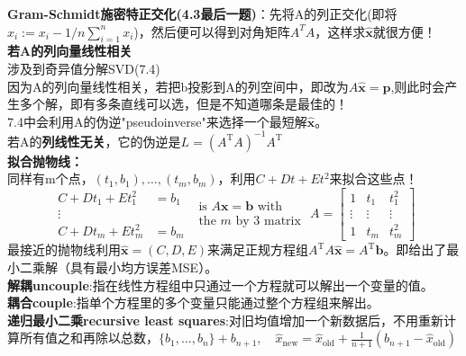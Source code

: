 \documentclass[UTF8]{article}
\begin{document}
    \textbf{Gram-Schmidt施密特正交化(4.3最后一题)}：先将A的列正交化(即将$x_i := x_i - 1/n\sum_{i=1}^{n}x_i$)，然后便可以得到对角矩阵$A^T A$，这样求$\widehat{\bm{x}}$就很方便！
    \\
    \textbf{若A的列向量线性相关}\\
    涉及到奇异值分解SVD(7.4)\\
    因为A的列向量线性相关，若把b投影到A的列空间中，即改为$A \widehat{\boldsymbol{x}}=\boldsymbol{p}$,则此时会产生多个解，即有多条直线可以选，但是不知道哪条是最佳的！
    \\
    7.4中会利用A的伪逆"pseudoinverse"来选择一个最短解$\widehat{\bm{x}}$。\\
    若A的\textbf{列线性无关}，它的伪逆是$L=\left(A^{\mathrm{T}} A\right)^{-1} A^{\mathrm{T}}$
    \\
    \textbf{拟合抛物线：}\\
    同样有m个点，$(t_{1},b_{1}), \dots, (t_{m},b_{m})$，利用$C+D t+E t^{2}$来拟合这些点！\\
    $$
    \begin{aligned} C+D t_{1}+E t_{1}^{2} &=b_{1} \\ \vdots & \\ C+D t_{m}+E t_{m}^{2} &=b_{m} \end{aligned}
    \begin{array}{l}{\text { is } A \boldsymbol{x}=\boldsymbol{b} \text { with }} \\ {\text { the } m \text { by } 3 \text { matrix }}\end{array}
    A=\left[\begin{array}{ccc}{1} & {t_{1}} & {t_{1}^{2}} \\ {\vdots} & {\vdots} & {\vdots} \\ {1} & {t_{m}} & {t_{m}^{2}}\end{array}\right]
    $$
    最接近的抛物线利用$\widehat{\boldsymbol{x}}=(C, D, E)$来满足正规方程组$A^{\mathrm{T}} A \widehat{\boldsymbol{x}}=A^{\mathrm{T}} \boldsymbol{b}$。即给出了最小二乘解（具有最小均方误差MSE）。
    \\
    \textbf{解耦uncouple}:指在线性方程组中只通过一个方程就可以解出一个变量的值。\\
    \textbf{耦合couple}:指单个方程里的多个变量只能通过整个方程组来解出。
    \\
    \textbf{递归最小二乘recursive least squares}:对旧均值增加一个新数据后，不用重新计算所有值之和再除以总数，$\{b_1,\dots, b_n\}+ b_{n+1},\quad \widehat{x}_{\mathrm{new}}=\widehat{x}_{\mathrm{old}}+\frac{1}{n+1}\left(b_{n+1}-\widehat{x}_{\mathrm{old}}\right)$
    \\
\end{document}
